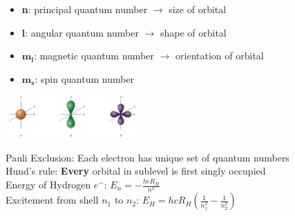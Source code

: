     \vspace*{0.3em}
    
    \begin{itemize}
        \itemsep0em
        \item \textbf{n}: principal quantum number $\rightarrow$ size of orbital
        \item \textbf{l}: angular quantum number $\rightarrow$ shape of orbital
        \item $\boldsymbol{m_l}$: magnetic quantum number $\rightarrow$ orientation of orbital
        \item $\boldsymbol{m_s}$: spin quantum number
    \end{itemize}
    \centerline{\includegraphics[width=50mm]{src/2_Atoms/images/orbital_shapes.png}}
    
    Pauli Exclusion: Each electron has unique set of quantum numbers\\
    Hund's rule: \textbf{Every} orbital in sublevel is first singly occupied\\
    Energy of Hydrogen $e^-$: $E_n = -\frac{hcR_H}{n^2}$\\
    Excitement from shell $n_1$ to $n_2$: $E_H = hcR_H (\frac{1}{n_1^2} - \frac{1}{n_2^2})$